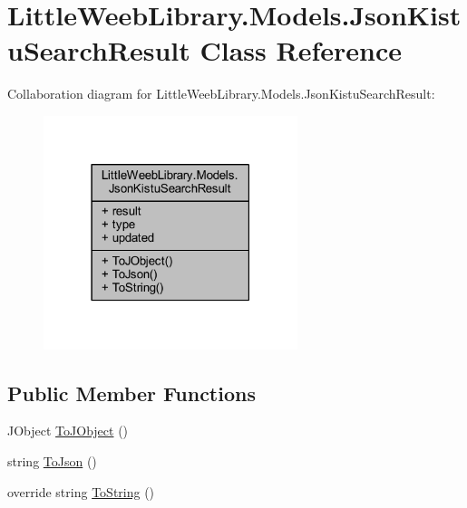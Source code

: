 \hypertarget{class_little_weeb_library_1_1_models_1_1_json_kistu_search_result}{}\section{Little\+Weeb\+Library.\+Models.\+Json\+Kistu\+Search\+Result Class Reference}
\label{class_little_weeb_library_1_1_models_1_1_json_kistu_search_result}


Collaboration diagram for Little\+Weeb\+Library.\+Models.\+Json\+Kistu\+Search\+Result\+:\nopagebreak
\begin{figure}[H]
\begin{center}
\leavevmode
\includegraphics[width=210pt]{class_little_weeb_library_1_1_models_1_1_json_kistu_search_result__coll__graph}
\end{center}
\end{figure}
\subsection*{Public Member Functions}
\begin{DoxyCompactItemize}
\item 
J\+Object \mbox{\hyperlink{class_little_weeb_library_1_1_models_1_1_json_kistu_search_result_aa70ee158546f0b562318b143aca9d86f}{To\+J\+Object}} ()
\item 
string \mbox{\hyperlink{class_little_weeb_library_1_1_models_1_1_json_kistu_search_result_a6adca32faf08b7fb63c9f469ab3fbcae}{To\+Json}} ()
\item 
override string \mbox{\hyperlink{class_little_weeb_library_1_1_models_1_1_json_kistu_search_result_a24e08aec40ba54db7235bb4ef9be8b11}{To\+String}} ()
\end{DoxyCompactItemize}
